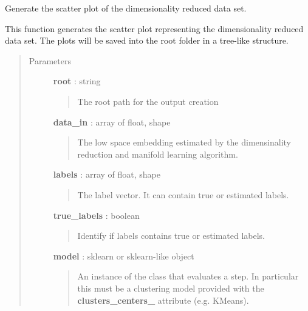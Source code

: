 \documentclass[letterpaper,10pt,english]{sphinxmanual}
\begin{document}
\begin{fulllineitems}
\label{index:adenine.core.plotting.scatter}
Generate the scatter plot of the dimensionality reduced data set.

This function generates the scatter plot representing the dimensionality
reduced data set. The plots will be saved into the root folder in a
tree-like structure.
\begin{quote}\begin{description}
\item[{Parameters}] \leavevmode
\textbf{root} : string
\begin{quote}

The root path for the output creation
\end{quote}

\textbf{data\_in} : array of float, shape
\begin{quote}

The low space embedding estimated by the dimensinality reduction and
manifold learning algorithm.
\end{quote}

\textbf{labels} : array of float, shape
\begin{quote}

The label vector. It can contain true or estimated labels.
\end{quote}

\textbf{true\_labels} : boolean
\begin{quote}

Identify if labels contains true or estimated labels.
\end{quote}

\textbf{model} : sklearn or sklearn-like object
\begin{quote}

An instance of the class that evaluates a step. In particular this must
be a clustering model provided with the {\color{red}\bfseries{}clusters\_centers\_} attribute
(e.g. KMeans).
\end{quote}

\end{description}\end{quote}

\end{fulllineitems}

\end{document}
